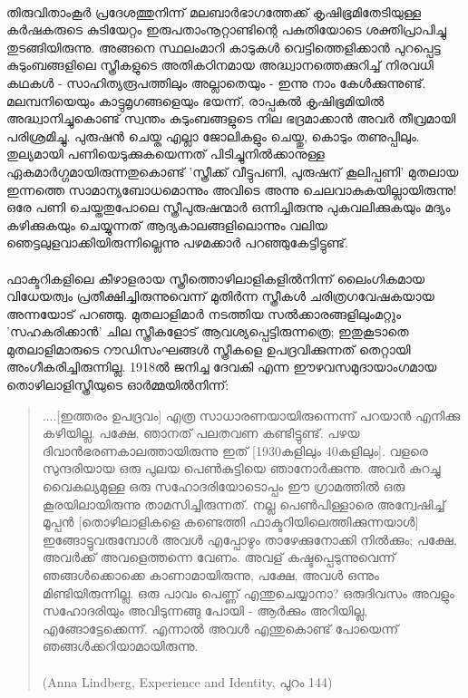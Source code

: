 \paragraph{}തിരുവിതാംകൂർ പ്രദേശത്തുനിന്ന് മലബാർഭാഗത്തേക്ക് കൃഷിഭൂമിതേടിയുള്ള കർഷകരുടെ കുടിയേറ്റം ഇരുപതാംനൂറ്റാണ്ടിന്റെ പകുതിയോടെ ശക്തിപ്രാപിച്ചു തുടങ്ങിയിരുന്നു. അങ്ങനെ സ്ഥലംമാറി കാടുകൾ വെട്ടിത്തെളിക്കാൻ പുറപ്പെട്ട കുടുംബങ്ങളിലെ സ്ത്രീകളുടെ അതികഠിനമായ അദ്ധ്വാനത്തെക്കുറിച്ച് നിരവധി കഥകൾ - സാഹിത്യരൂപത്തിലും അല്ലാതെയും - ഇന്നു നാം കേൾക്കുന്നുണ്ട്. മലമ്പനിയെയും കാട്ടുമൃഗങ്ങളെയും ഭയന്ന്, രാപ്പകൽ കൃഷിഭൂമിയിൽ അദ്ധ്വാനിച്ചുകൊണ്ട് സ്വന്തം കുടുംബങ്ങളുടെ നില ഭദ്രമാക്കാൻ അവർ തീവ്രമായി പരിശ്രമിച്ചു. പുരുഷൻ ചെയ്ത എല്ലാ ജോലികളും ചെയ്തു, കൊടും തണുപ്പിലും. തുല്യമായി പണിയെടുക്കുകയെന്നത് പിടിച്ചുനിൽക്കാനുള്ള ഏകമാർഗ്ഗമായിരുന്നതുകൊണ്ട് 'സ്ത്രീക്ക് വീട്ടുപണി, പുരുഷന് കൂലിപ്പണി' മുതലായ ഇന്നത്തെ സാമാന്യബോധമൊന്നും അവിടെ അന്നു ചെലവാകുകയില്ലായിരുന്നു! ഒരേ പണി ചെയ്തതുപോലെ സ്ത്രീപുരുഷന്മാർ ഒന്നിച്ചിരുന്നു പുകവലിക്കുകയും മദ്യം കഴിക്കുകയും ചെയ്യുന്നത് ആദ്യകാലങ്ങളിലൊന്നും വലിയ ഞെട്ടലുളവാക്കിയിരുന്നില്ലെന്നു പഴമക്കാർ പറഞ്ഞുകേട്ടിട്ടുണ്ട്.

\paragraph{}ഫാക്ടറികളിലെ കീഴാളരായ സ്ത്രീത്തൊഴിലാളികളിൽനിന്ന് ലൈംഗികമായ വിധേയത്വം പ്രതീക്ഷിച്ചിരുന്നുവെന്ന് മുതിർന്ന സ്ത്രീകൾ ചരിത്രഗവേഷകയായ അന്നയോട് പറഞ്ഞു. മുതലാളിമാർ നടത്തിയ സൽക്കാരങ്ങളിലുംമറ്റും 'സഹകരിക്കാൻ' ചില സ്ത്രീകളോട് ആവശ്യപ്പെട്ടിരുന്നത്രെ; ഇതുകൂടാതെ മുതലാളിമാരുടെ റൗഡിസംഘങ്ങൾ സ്ത്രീകളെ ഉപദ്രവിക്കുന്നത് തെറ്റായി അംഗീകരിച്ചിരുന്നില്ല. 1918ൽ ജനിച്ച ദേവകി എന്ന ഈഴവസമുദായാംഗമായ തൊഴിലാളിസ്ത്രീയുടെ ഓർമ്മയിൽനിന്ന്:
\begin{quotation}
\noindent ....[ഇത്തരം ഉപദ്രവം] എത്ര സാധാരണയായിരുന്നെന്ന് പറയാൻ എനിക്കു കഴിയില്ല. പക്ഷേ, ഞാനത് പലതവണ കണ്ടിട്ടുണ്ട്. പഴയ ദിവാൻഭരണകാലത്തായിരുന്നു ഇത് [1930കളിലും 40കളിലും]. വളരെ സുന്ദരിയായ ഒരു പുലയ പെൺകുട്ടിയെ ഞാനോർക്കുന്നു. അവർ കുറച്ചു വൈകല്യമുള്ള ഒരു സഹോദരിയോടൊപ്പം ഈ ഗ്രാമത്തിൽ ഒരു കൂരയിലായിരുന്നു താമസിച്ചിരുന്നത്. നല്ല പെൺപിള്ളാരെ അന്വേഷിച്ച് മൂപ്പൻ [തൊഴിലാളികളെ കണ്ടെത്തി ഫാക്ടറിയിലെത്തിക്കുന്നയാൾ] ഇങ്ങോട്ടുവരുമ്പോൾ അവൾ എപ്പോഴും താഴേക്കുനോക്കി നിൽക്കും; പക്ഷേ, അവർക്ക് അവളെത്തന്നെ വേണം. അവള് കഷ്ടപ്പെടുന്നുവെന്ന് ഞങ്ങൾക്കൊക്കെ കാണാമായിരുന്നു, പക്ഷേ, അവൾ ഒന്നും മിണ്ടിയിരുന്നില്ല. ഒരു പാവം പെണ്ണ് എന്തുചെയ്യാനാ? ഒരുദിവസം അവളും സഹോദരിയും അവിടുന്നങ്ങു പോയി - ആർക്കും അറിയില്ല, എങ്ങോട്ടേക്കെന്ന്. എന്നാൽ അവൾ എന്തുകൊണ്ട് പോയെന്ന് ഞങ്ങൾക്കറിയാമായിരുന്നു.\\
\\(Anna Lindberg, Experience and Identity, പുറം 144)
\end{quotation}
